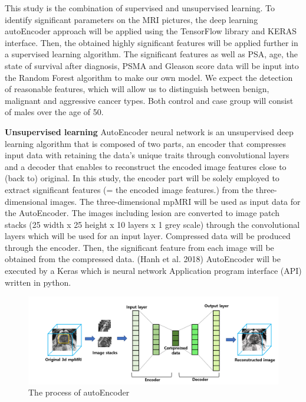\documentclass[11pt]{article}
\begin{document}
This study is the combination of supervised and unsupervised learning. To identify significant parameters on the MRI pictures, the deep learning autoEncoder approach will be applied using the TensorFlow library and KERAS interface. Then, the obtained highly significant features will be applied further in a supervised learning algorithm. The significant features as well as PSA, age, the state of survival after diagnosis, PSMA and Gleason score data will be input into the Random Forest algorithm to make our own model. We expect the detection of reasonable features, which will allow us to distinguish between benign, malignant and aggressive cancer types. Both control and case group will consist of males over the age of 50. 
\vspace{5mm}


\vspace{7mm}
\textbf{Unsupervised learning}
\newline
AutoEncoder neural network is an unsupervised deep learning algorithm that is composed of two parts, an encoder that compresses input data with retaining the data’s unique traits through convolutional layers and a decoder that enables to reconstruct the encoded image features close to (back to) original. In this study, the encoder part will be solely employed to extract significant features (= the encoded image features.) from the three-dimensional images.
The three-dimensional mpMRI will be used as input data for the AutoEncoder. The images including lesion are converted to image patch stacks (25 width x 25 height x 10 layers x 1 grey scale) through the convolutional layers which will be used for an input layer. Compressed data will be produced through the encoder. Then, the significant feature from each image will be obtained from the compressed data. (Hanh et al. 2018) 
AutoEncoder will be executed by a Keras which is neural network Application program interface (API) written in python.
\vspace{7mm}
\begin{figure}[H]
\centering
\includegraphics[width=0.98\linewidth]{Fig1_The_process_of_autoEncoder.png} 
\vspace{-3mm}
\caption{\footnotesize The process of autoEncoder
}
\label{fig:fig3}
\end{figure}
\end{document}
